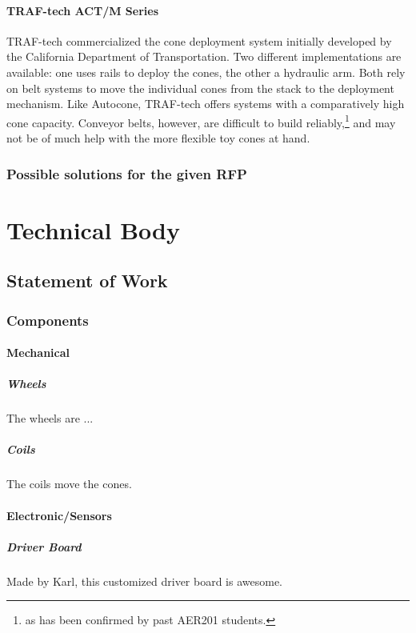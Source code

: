 \documentclass[11pt]{report}
\begin{document}
\subsubsection{TRAF-tech ACT/M Series}
TRAF-tech commercialized the cone deployment system initially developed by the California Department of Transportation. Two different implementations are available: one uses rails to deploy the cones, the other a hydraulic arm. Both rely on belt systems to move the individual cones from the stack to the deployment mechanism. Like Autocone, TRAF-tech offers systems with a comparatively high cone capacity. Conveyor belts, however, are difficult to build reliably,\footnote{as has been confirmed by past AER201 students.} and may not be of much help with the more flexible toy cones at hand.


\subsection{Possible solutions for the given RFP}


\chapter{Technical Body}

\section{Statement of Work}
\subsection{Components}
\subsubsection{Mechanical}
\paragraph{Wheels}
The wheels are ...
\paragraph{Coils}
The coils move the cones.
\subsubsection{Electronic/Sensors}
\paragraph{Driver Board}
Made by Karl, this customized driver board is awesome.
\end{document}
